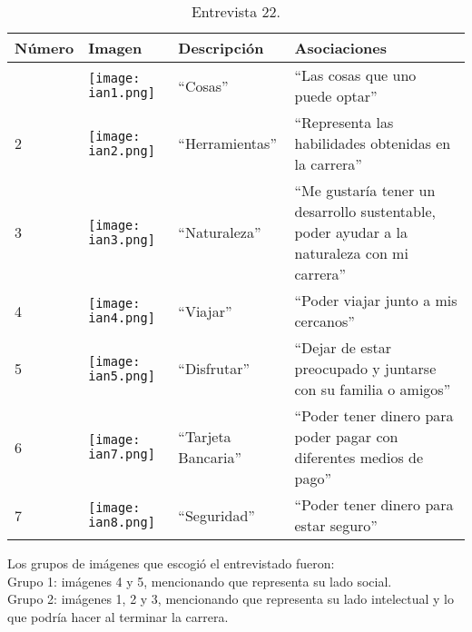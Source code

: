 \begin{table}[H]
	\centering
	\begin{tabular}{>{\centering\arraybackslash}m{1cm} >{\centering\arraybackslash}m{2cm} >{\arraybackslash}m{5cm}>{\arraybackslash}m{5cm}}
		\hline
		Número  & Imagen & Descripción & Asociaciones \\
		\hline \hline
		
		1 & \texttt{[image: ian1.png]} & ``Cosas'' & ``Las cosas que uno puede optar'' \\
		\hline
		
		2 & \texttt{[image: ian2.png]} & ``Herramientas'' & ``Representa las habilidades obtenidas en la carrera'' \\
		\hline
		
		3 & \texttt{[image: ian3.png]} & ``Naturaleza'' & ``Me gustaría tener un desarrollo sustentable, poder ayudar a la naturaleza con mi carrera'' \\
		\hline
		
		4 & \texttt{[image: ian4.png]} & ``Viajar'' & ``Poder viajar junto a mis cercanos'' \\
		\hline
		
		5 & \texttt{[image: ian5.png]} & ``Disfrutar'' & ``Dejar de estar preocupado y juntarse con su familia o amigos'' \\
		\hline
		
		
		6 & \texttt{[image: ian7.png]} & ``Tarjeta Bancaria'' & ``Poder tener dinero para poder pagar con diferentes medios de pago'' \\
		\hline	
			
		7 & \texttt{[image: ian8.png]} & ``Seguridad'' & ``Poder tener dinero para estar seguro'' \\
		\hline
		
	\end{tabular}
	\caption{Entrevista 22.}
	\label{tabla:ian}
\end{table}

Los grupos de imágenes que escogió el entrevistado fueron:\\

Grupo 1: imágenes 4 y 5, mencionando que representa su lado social. \\

Grupo 2: imágenes 1, 2 y 3, mencionando que representa su lado intelectual y lo que podría hacer al terminar la carrera.\\

